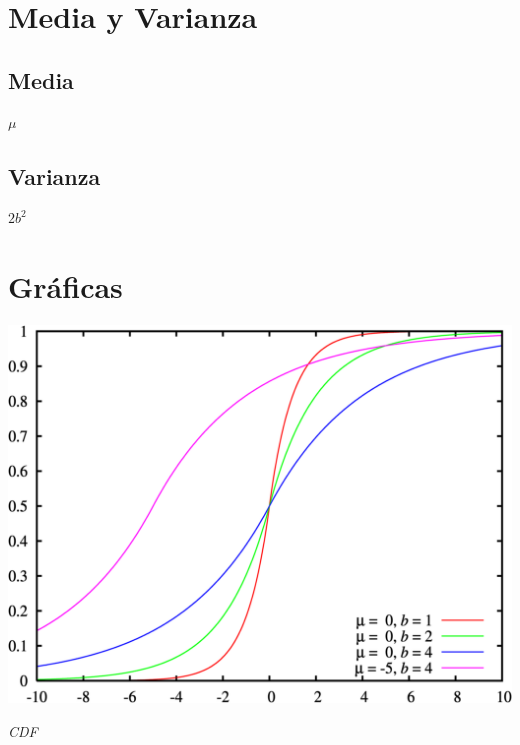 \section{Media y Varianza}
\subsection{Media}
\begin{center}
	$\mu$
\end{center}

\subsection{Varianza}
\begin{center}
	$2b^2$
\end{center}
	
\section{Gráficas}
\begin{center}
	\includegraphics[scale=0.3]{imgs/laplace-cdf.png}
	
	\textit{CDF}
\end{center}


